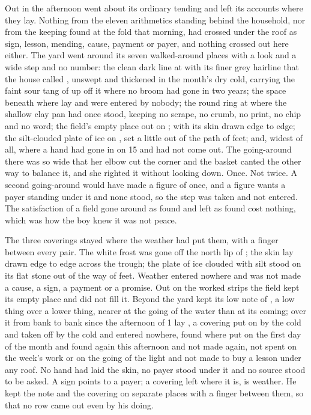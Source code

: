 Out in  the afternoon went about its ordinary tending and left its accounts where they lay. Nothing from the eleven arithmetics standing behind the household, nor from the keeping found at the fold that morning, had crossed under the roof as sign, lesson, mending, cause, payment or payer, and nothing crossed out here either. The yard went around its seven walked-around places with a look and a wide step and no number: the clean dark line at  with its finer grey hairline that the house called , unswept and thickened in the month's dry cold, carrying the faint sour tang of  up off it where no broom had gone in two years; the space beneath  where  lay and were entered by nobody; the round ring at  where the shallow clay pan had once stood, keeping no scrape, no crumb, no print, no chip and no word; the field's empty place out on ;  with its skin drawn edge to edge; the silt-clouded plate of ice on , set a little out of the path of feet; and, widest of all,  where a hand had gone in on  15 and had not come out. The going-around there was so wide that her elbow cut the corner and the basket canted the other way to balance it, and she righted it without looking down. Once. Not twice. A second going-around would have made a figure of once, and a figure wants a payer standing under it and none stood, so the step was taken and not entered. The satisfaction of a field gone around as found and left as found cost nothing, which was how the boy knew it was not peace.

The three coverings stayed where the weather had put them, with a finger between every pair. The white frost was gone off the north lip of ; the skin lay drawn edge to edge across the trough; the plate of ice clouded with silt stood on its flat stone out of the way of feet. Weather entered nowhere and was not made a cause, a sign, a payment or a promise. Out on the worked strips the field kept its empty place and did not fill it. Beyond the yard  kept its low note of , a low thing over a lower thing, nearer at the going of the water than at its coming; over it from bank to bank since the afternoon of  1 lay , a covering put on by the cold and taken off by the cold and entered nowhere, found where put on the first day of the month and found again this afternoon and not made again, not spent on the week's work or on the going of the light and not made to buy a lesson under any roof. No hand had laid the skin, no payer stood under it and no source stood to be asked. A sign points to a payer; a covering left where it is, is weather. He kept the note and the covering on separate places with a finger between them, so that no row came out even by his doing.

